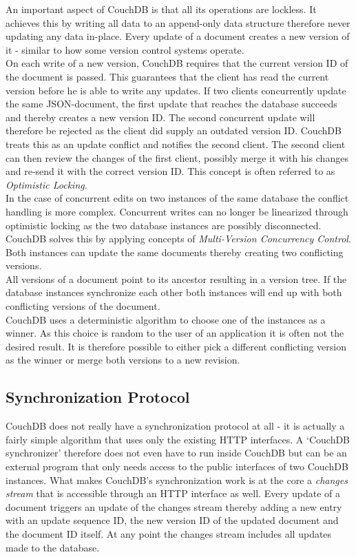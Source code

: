 An important aspect of CouchDB is that all its operations are lockless.
It achieves this by writing all data to an append-only data structure therefore never updating any data in-place.
Every update of a document creates a new version of it - similar to how some version control systems operate.\\
On each write of a new version, CouchDB requires that the current version ID of the document is passed.
This guarantees that the client has read the current version before he is able to write any updates.
If two clients concurrently update the same JSON-document, the first update that reaches the database succeeds and thereby creates a new version ID.
The second concurrent update will therefore be rejected as the client did supply an outdated version ID.
CouchDB treats this as an update conflict and notifies the second client.
The second client can then review the changes of the first client, possibly merge it with his changes and re-send it with the correct version ID.
This concept is often referred to as \emph{Optimistic Locking}.\\

In the case of concurrent edits on two instances of the same database the conflict handling is more complex.
Concurrent writes can no longer be linearized through optimistic locking as the two database instances are possibly disconnected.\\
CouchDB solves this by applying concepts of \emph{Multi-Version Concurrency Control}.
Both instances can update the same documents thereby creating two conflicting versions.\\
All versions of a document point to its ancestor resulting in a version tree.
If the database instances synchronize each other both instances will end up with both conflicting versions of the document.\\
CouchDB uses a deterministic algorithm to choose one of the instances as a winner.
As this choice is random to the user of an application it is often not the desired result.
It is therefore possible to either pick a different conflicting version as the winner or merge both versions to a new revision.

\subsection{Synchronization Protocol}
CouchDB does not really have a synchronization protocol at all - it is actually a fairly simple algorithm that uses only the existing HTTP interfaces.
A `CouchDB synchronizer' therefore does not even have to run inside CouchDB but can be an external program that only needs access to the public interfaces of two CouchDB instances.
What makes CouchDB's synchronization work is at the core a \emph{changes stream} that is accessible through an HTTP interface as well.
Every update of a document triggers an update of the changes stream thereby adding a new entry with an update sequence ID, the new version ID of the updated document and the document ID itself.
At any point the changes stream includes all updates made to the database.\\

